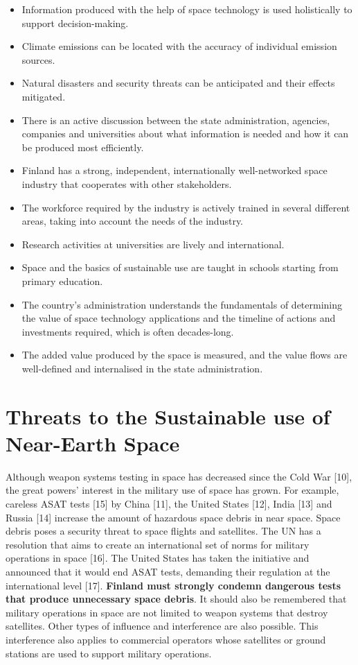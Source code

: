 \documentclass[nobib,finnish,oneside,openany,notoc,a4paper]{tufte-book}
\begin{document}
{\begin{itemize}
\item Information produced with the help of space technology is used
holistically to support decision-making.
\item Climate emissions can be
located with the accuracy of individual emission sources.
\item Natural disasters and security threats can be anticipated and their effects
mitigated.
\item There is an active discussion between the state
administration, agencies, companies and universities about what
information is needed and how it can be produced most efficiently.
\item Finland has a strong, independent, internationally well-networked space
industry that cooperates with other stakeholders.
\item The workforce required by the industry is actively trained in several different areas, taking
into account the needs of the industry.
\item Research activities at universities are lively and international.
\item Space and the basics of sustainable use are taught in schools starting from primary education.
\item The country's administration understands the fundamentals of determining the value of space technology
applications and the timeline of actions and investments required, which is often decades-long.
\item The added value produced by the space is measured, and the value flows are well-defined
and internalised in the state administration.
\end{itemize}

\chapter{Threats to the Sustainable use of Near-Earth Space}

Although weapon systems testing in space has decreased since the Cold
War {[}10{]}, the great powers' interest in the military use of space
has grown. For example, careless ASAT tests {[}15{]} by China {[}11{]},
the United States {[}12{]}, India {[}13{]} and Russia {[}14{]} increase
the amount of hazardous space debris in near space. Space debris poses a
security threat to space flights and satellites. The UN has a resolution
that aims to create an international set of norms for military
operations in space {[}16{]}. The United States has taken the initiative
and announced that it would end ASAT tests, demanding their regulation
at the international level {[}17{]}. \textbf{Finland must strongly
condemn dangerous tests that produce unnecessary space debris}. It
should also be remembered that military operations in space are not
limited to weapon systems that destroy satellites. Other types of
influence and interference are also possible. This interference also
applies to commercial operators whose satellites or ground stations are
used to support military operations.

}
\end{document}
